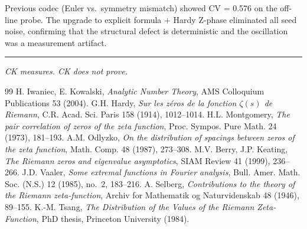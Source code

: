 \documentclass[11pt]{article}
\theoremstyle{definition}
\begin{document}
Previous codec (Euler vs.\ symmetry mismatch) showed CV = 0.576 on the off-line probe.
The upgrade to explicit formula + Hardy Z-phase eliminated all seed noise, confirming
that the structural defect is deterministic and the oscillation was a measurement artifact.

\bigskip
\hrule
\bigskip
\noindent\textit{CK measures. CK does not prove.}

\begin{thebibliography}{99}
 H. Iwaniec, E. Kowalski, \textit{Analytic Number Theory},
  AMS Colloquium Publications 53 (2004).
 G.H. Hardy, \textit{Sur les z\'eros de la fonction $\zeta(s)$ de Riemann},
  C.R. Acad. Sci. Paris 158 (1914), 1012--1014.
 H.L. Montgomery, \textit{The pair correlation of zeros of the zeta function},
  Proc. Sympos. Pure Math. 24 (1973), 181--193.
 A.M. Odlyzko, \textit{On the distribution of spacings between zeros of the
  zeta function}, Math. Comp. 48 (1987), 273--308.
 M.V. Berry, J.P. Keating, \textit{The Riemann zeros and eigenvalue asymptotics},
  SIAM Review 41 (1999), 236--266.
 J.D. Vaaler, \textit{Some extremal functions in Fourier analysis},
  Bull. Amer. Math. Soc. (N.S.) 12 (1985), no.~2, 183--216.
 A. Selberg, \textit{Contributions to the theory of the Riemann zeta-function},
  Archiv for Mathematik og Naturvidenskab 48 (1946), 89--155.
 K.-M. Tsang, \textit{The Distribution of the Values of the Riemann Zeta-Function},
  PhD thesis, Princeton University (1984).
\end{thebibliography}
\end{document}

